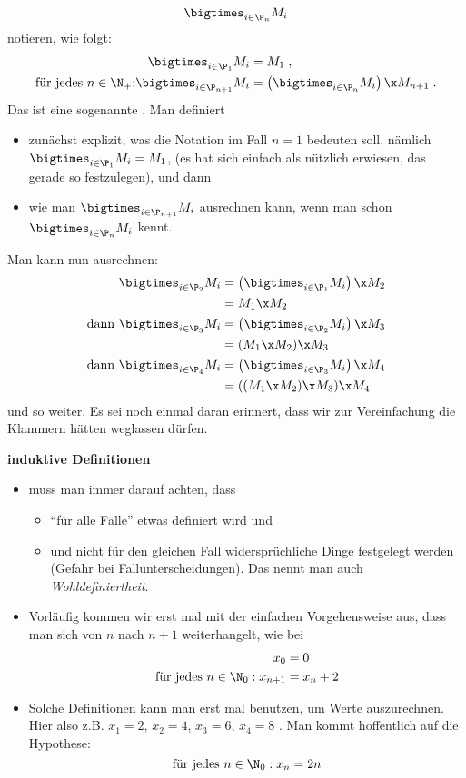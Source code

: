 \[
  \bigtimes_{i\in\P_n} M_i
\]
notieren, wie folgt:
\begin{align*}
  \bigtimes_{i\in\P_1} M_i &= M_1 \;, \\
  \text{für jedes $n\in\N_+$:} \bigtimes_{i\in\P_{n+1}} M_i &= \left(\bigtimes_{i\in\P_{n}} M_i\right) \x M_{n+1} \;.
\end{align*}
%
Das ist eine sogenannte .
%
Man definiert
%
\begin{itemize}
\item zunächst explizit, was die Notation im Fall $n=1$
  bedeuten soll, nämlich $\bigtimes_{i\in\P_1} M_i = M_1$,
  (es hat sich einfach als nützlich erwiesen, das gerade so festzulegen), und
  dann
\item wie man $\bigtimes_{i\in\P_{n+1}} M_i$
  ausrechnen kann, wenn man schon $\bigtimes_{i\in\P_{n}} M_i$ kennt.
\end{itemize}
%
Man kann nun \zB ausrechnen:
\begin{align*}
  \bigtimes_{i\in\P_2} M_i &= \left(\bigtimes_{i\in\P_{1}} M_i\right) \x M_{2} \\
  &= M_1 \x M_2 \\
  \text{dann }   \bigtimes_{i\in\P_3} M_i &= \left(\bigtimes_{i\in\P_{2}} M_i\right) \x M_{3} \\
  &= (M_1 \x M_2) \x M_3 \\
  \text{dann }   \bigtimes_{i\in\P_4} M_i &= \left(\bigtimes_{i\in\P_{3}} M_i\right) \x M_{4} \\
  &= ((M_1 \x M_2) \x M_3) \x M_4 
\end{align*}
und so weiter.
%
Es sei noch einmal daran erinnert, dass wir zur Vereinfachung die Klammern
hätten weglassen dürfen.
%
\begin{tutorium}
  \textbf{induktive Definitionen}

  \begin{itemize}
  \item muss man immer darauf achten, dass
    \begin{itemize}
    \item "`für alle Fälle"' etwas definiert wird und
    \item und nicht für den gleichen Fall widersprüchliche Dinge
      festgelegt werden (Gefahr \zB bei Fallunterscheidungen). Das nennt
      man auch \emph{Wohldefiniertheit}.
    \end{itemize}
  \item Vorläufig kommen wir erst mal mit der einfachen Vorgehensweise
    aus, dass man sich von $n$ nach $n+1$ weiterhangelt, wie bei
    \begin{align*}
      x_0     &= 0 \\
      \text{für jedes } n\in\N_0: x_{n+1} &= x_n + 2 \\
    \end{align*}
  \item Solche Definitionen kann man erst mal benutzen, um Werte
    auszurechnen. Hier also z.B.  $x_1 = 2$, $x_2 = 4$, $x_3 = 6$,
    $x_4 = 8$ \usw.  Man kommt hoffentlich auf die Hypothese:
    \[
    \text{für jedes }  n\in\N_0:  x_n = 2n
    \]
  \end{itemize}
\end{tutorium}
